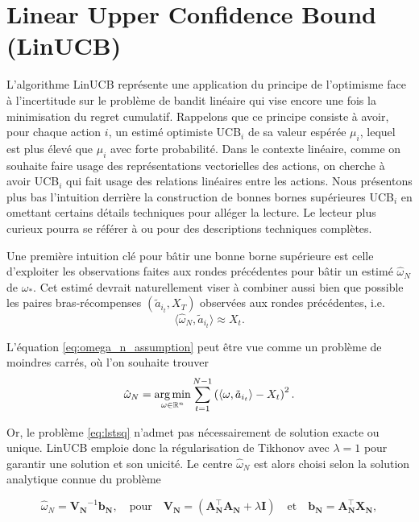 \section{Linear Upper Confidence Bound (LinUCB)}

L'algorithme LinUCB \citep{chu2011contextual} représente une application 
du principe de l'optimisme face à l'incertitude sur le problème de bandit linéaire
qui vise encore une fois la minimisation du regret cumulatif.
Rappelons que ce principe consiste à avoir, pour chaque action $i$, un estimé optimiste UCB$_i$
de sa valeur espérée $\mu_i$, lequel est plus élevé que $\mu_i$ avec forte probabilité.
Dans le contexte linéaire, comme on souhaite faire usage des représentations vectorielles 
des actions, on cherche à avoir UCB$_i$ qui fait usage des relations linéaires entre les 
actions.
Nous présentons plus bas l'intuition derrière la construction de bonnes bornes supérieures
UCB$_i$ en omettant certains détails techniques pour alléger la lecture.
Le lecteur plus curieux pourra se référer à \citep{chu2011contextual} ou \citep{abbasi2011improved}
pour des descriptions techniques complètes.

Une première intuition clé pour bâtir une bonne borne supérieure est celle d'exploiter 
les observations faites aux rondes précédentes pour bâtir un estimé $\hat{\omega}_N$ de 
$\omega_*$.
Cet estimé devrait naturellement viser 
à combiner aussi bien que possible les paires bras-récompenses $(\tilde{a}_{i_t}, X_T)$
observées aux rondes précédentes, i.e.
\begin{equation}
    \langle \hat{\omega}_N, \tilde{a}_{i_t}\rangle \approx X_t.    
    \label{eq:omega_n_assumption}
\end{equation}

L'équation \eqref{eq:omega_n_assumption} peut être vue comme un problème 
de moindres carrés, où l'on souhaite trouver
\begin{equation}
    \hat{\omega}_N = \operatorname*{arg\,min}_{\omega \in \mathbb{R}^n} \sum_{t=1}^{N-1} \left( \langle \omega, \tilde{a}_{i_t} \rangle - X_t \right)^2.
    \label{eq:lstsq}
\end{equation}

Or, le problème \eqref{eq:lstsq} n'admet pas nécessairement de solution exacte ou unique.
LinUCB emploie donc la régularisation de Tikhonov \citep{tikhonov1963solution} 
avec $\lambda=1$ pour garantir une solution et son unicité.
Le centre $\hat{\omega}_N$ est alors choisi selon la solution analytique connue du
problème

\begin{equation}
    \hat{\omega}_N = \mathbf{V_N}^{-1}\mathbf{b_N}, \quad \text{pour} \quad \mathbf{V_N} = (\mathbf{A^\top_N} \mathbf{A_N} + \lambda \mathbf{I}) \quad \text{et} \quad \mathbf{b_N}=\mathbf{A_N^\top} \mathbf{X_N},
    \label{eq:omega_N}
\end{equation}

